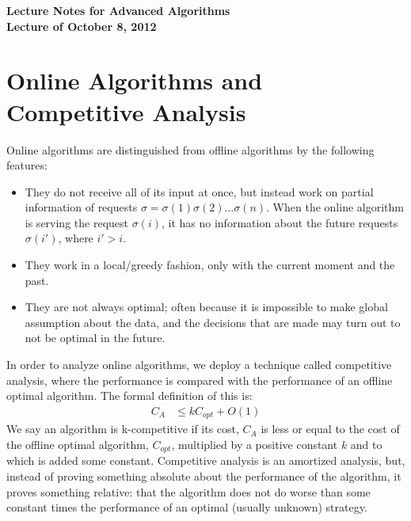 \documentclass{article}
\begin{document}
\begin{center}
  \Large\bf
  Lecture Notes for Advanced Algorithms\\

  \medskip
  \large\sf
  Lecture of October 8, 2012\\
\end{center}

\section{Online Algorithms and Competitive Analysis}

Online algorithms are distinguished from offline algorithms by the following
features:
\begin{itemize}
\item They do not receive all of its input at once, 
but instead work on partial information
of requests $\sigma = \sigma(1) \sigma(2) \ldots \sigma(n)$. 
When the online algorithm is serving the request $\sigma(i)$, 
it has no information about the future requests $\sigma(i')$, where $i'>i$.
\item They work in a local/greedy fashion, only with the current moment and the past.
\item They are not always optimal; often because it is impossible to make global
assumption about the data, and the decisions that are made may turn out
to not be optimal in the future.
\end{itemize}

In order to analyze online algorithms, we deploy a technique called competitive analysis, 
where the performance is compared with the performance of an offline optimal algorithm. 
The formal definition of this is:
\begin{align}
  C_A &\leq kC_{opt} + O(1) \nonumber
\end{align}
We say an algorithm is k-competitive if its cost, $C_A$ is less or equal to the cost of the offline optimal algorithm, 
$C_{opt}$, multiplied by a positive constant $k$ and to which is added some constant. 
Competitive analysis is an amortized analysis, but, instead of proving something
absolute about the performance of the algorithm, it proves something relative: 
that the algorithm does not do worse than some constant times the performance of an optimal (usually unknown) strategy.
\end{document}
